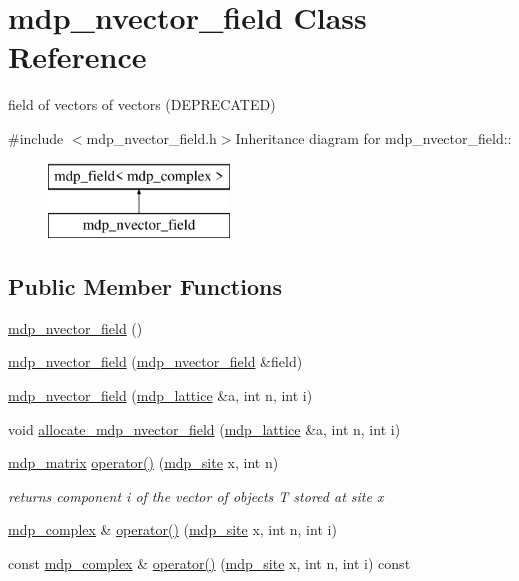 \hypertarget{classmdp__nvector__field}{
\section{mdp\_\-nvector\_\-field Class Reference}
\label{classmdp__nvector__field}
}


field of vectors of vectors (DEPRECATED)  


{\ttfamily \#include $<$mdp\_\-nvector\_\-field.h$>$}Inheritance diagram for mdp\_\-nvector\_\-field::\begin{figure}[H]
\begin{center}
\leavevmode
\includegraphics[height=2cm]{classmdp__nvector__field}
\end{center}
\end{figure}
\subsection*{Public Member Functions}
\begin{DoxyCompactItemize}
\item 
\hyperlink{classmdp__nvector__field_a528129f314282511fa8b910c09872972}{mdp\_\-nvector\_\-field} ()
\item 
\hyperlink{classmdp__nvector__field_a9f0e296ba904e19aa3065fb9df3680a4}{mdp\_\-nvector\_\-field} (\hyperlink{classmdp__nvector__field}{mdp\_\-nvector\_\-field} \&field)
\item 
\hyperlink{classmdp__nvector__field_a0fce9d8001cc5244ea0182249d571007}{mdp\_\-nvector\_\-field} (\hyperlink{classmdp__lattice}{mdp\_\-lattice} \&a, int n, int i)
\item 
void \hyperlink{classmdp__nvector__field_af884aa8d082498c443e33d9765cfa67e}{allocate\_\-mdp\_\-nvector\_\-field} (\hyperlink{classmdp__lattice}{mdp\_\-lattice} \&a, int n, int i)
\item 
\hyperlink{classmdp__matrix}{mdp\_\-matrix} \hyperlink{classmdp__nvector__field_afddf6115e2d88a72727d66949436d8ca}{operator()} (\hyperlink{classmdp__site}{mdp\_\-site} x, int n)
\begin{DoxyCompactList}\small\item\em returns component i of the vector of objects T stored at site x \item\end{DoxyCompactList}\item 
\hyperlink{classmdp__complex}{mdp\_\-complex} \& \hyperlink{classmdp__nvector__field_acc1e3d8cd4ea65935ebb8db11f5df3f4}{operator()} (\hyperlink{classmdp__site}{mdp\_\-site} x, int n, int i)
\item 
const \hyperlink{classmdp__complex}{mdp\_\-complex} \& \hyperlink{classmdp__nvector__field_a956c0f07251a1b0ea3069bc45131e330}{operator()} (\hyperlink{classmdp__site}{mdp\_\-site} x, int n, int i) const 
\end{DoxyCompactItemize}
